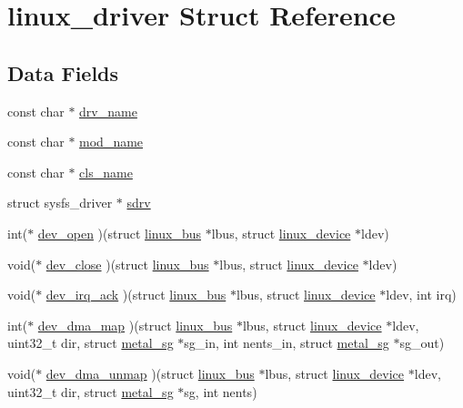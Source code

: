 \hypertarget{structlinux__driver}{}\section{linux\+\_\+driver Struct Reference}
\label{structlinux__driver}
\subsection*{Data Fields}
\begin{DoxyCompactItemize}
\item 
const char $\ast$ \hyperlink{structlinux__driver_a826db07b5a99a5782c46c61fb0e92f7d}{drv\+\_\+name}
\item 
const char $\ast$ \hyperlink{structlinux__driver_aa37549bd63322adbfd14e9d5f0c9bb9d}{mod\+\_\+name}
\item 
const char $\ast$ \hyperlink{structlinux__driver_acc2b5d168d0faf4c35c3448fa4dfe09e}{cls\+\_\+name}
\item 
struct sysfs\+\_\+driver $\ast$ \hyperlink{structlinux__driver_afce51f414c82ebf42eb22d778609bf8b}{sdrv}
\item 
int($\ast$ \hyperlink{structlinux__driver_a04a9c0f4533126f8eb99cba4541d5037}{dev\+\_\+open} )(struct \hyperlink{structlinux__bus}{linux\+\_\+bus} $\ast$lbus, struct \hyperlink{structlinux__device}{linux\+\_\+device} $\ast$ldev)
\item 
void($\ast$ \hyperlink{structlinux__driver_a9586d168f36bd57d55b806dfabbdf0af}{dev\+\_\+close} )(struct \hyperlink{structlinux__bus}{linux\+\_\+bus} $\ast$lbus, struct \hyperlink{structlinux__device}{linux\+\_\+device} $\ast$ldev)
\item 
void($\ast$ \hyperlink{structlinux__driver_ac82338447fda5bf62e14b2ec0435d623}{dev\+\_\+irq\+\_\+ack} )(struct \hyperlink{structlinux__bus}{linux\+\_\+bus} $\ast$lbus, struct \hyperlink{structlinux__device}{linux\+\_\+device} $\ast$ldev, int irq)
\item 
int($\ast$ \hyperlink{structlinux__driver_a9bc2f569ac44a7ef8f00c98b64cba740}{dev\+\_\+dma\+\_\+map} )(struct \hyperlink{structlinux__bus}{linux\+\_\+bus} $\ast$lbus, struct \hyperlink{structlinux__device}{linux\+\_\+device} $\ast$ldev, uint32\+\_\+t dir, struct \hyperlink{structmetal__sg}{metal\+\_\+sg} $\ast$sg\+\_\+in, int nents\+\_\+in, struct \hyperlink{structmetal__sg}{metal\+\_\+sg} $\ast$sg\+\_\+out)
\item 
void($\ast$ \hyperlink{structlinux__driver_a6ad2348e982e2d400579af675141ad59}{dev\+\_\+dma\+\_\+unmap} )(struct \hyperlink{structlinux__bus}{linux\+\_\+bus} $\ast$lbus, struct \hyperlink{structlinux__device}{linux\+\_\+device} $\ast$ldev, uint32\+\_\+t dir, struct \hyperlink{structmetal__sg}{metal\+\_\+sg} $\ast$sg, int nents)
\end{DoxyCompactItemize}


